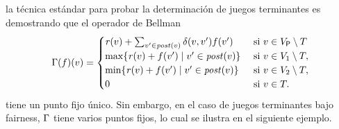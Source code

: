      




la técnica estándar para probar la determinación de juegos terminantes es demostrando que el operador de Bellman
%
\[
    \Gamma(f)(v) =
    \begin{cases}
           \mathit{r}(v)  + \sum_{v' \in \mathit{post}(v)} \delta(v,v')  f(v') & \text{ si } v \in V_{\mathsf{P}} \setminus T  \\
          \max \{\mathit{r}(v)  + f(v') \mid v' \in \mathit{post}(v) \}& \text{ si } v \in  V_1 \setminus T, \\
           \min \{\mathit{r}(v)  + f(v') \mid v' \in \mathit{post}(v) \} & \text{ si } v \in  V_2 \setminus T, \\
           0 & \text{ si } v \in T.
    \end{cases}
\]
%
tiene un punto fijo único. Sin embargo, en el caso de juegos terminantes bajo fairness,  $\Gamma$ tiene varios puntos fijos, lo cual se ilustra en el siguiente ejemplo.

